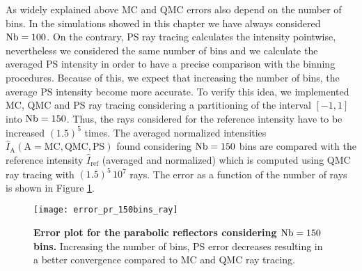 As widely explained above MC and QMC errors also depend on the number of bins. In the simulations showed in this chapter we have always considered $\textrm{Nb} = 100$. On the contrary, PS ray tracing calculates the intensity pointwise, nevertheless we considered the same number of bins and we calculate the averaged PS intensity in order to have a precise comparison with the binning procedures. Because of this, we expect that increasing the number of bins, the average PS intensity become more accurate. To verify this idea, we implemented MC, QMC and PS ray tracing considering a partitioning of the interval $[-1,1]$ into $\textrm{Nb} = 150$. Thus, the rays considered for the reference intensity have to be increased $(1.5)^5$ times. The averaged normalized intensities $\hat{I}_{\textrm{A}} (\textrm{A}=\textrm{MC}, \textrm{QMC}, \textrm{PS})$ found considering $\textrm{Nb}=150$ bins are compared with the reference intensity $\hat{I}_{\textrm{ref}}$ (averaged and normalized) which is computed using QMC ray tracing with $(1.5)^5\, 10^7$ rays. The error as a function of the number of rays is shown in Figure \ref{fig:error_pr_150_bin}. 
\begin{figure}[h]
  \center
  \texttt{[image: error\_pr\_150bins\_ray]}
  \caption{\textbf{Error plot for the parabolic reflectors considering $\textrm{Nb}=150$ bins.} Increasing the number of bins, PS error decreases resulting in a better convergence compared to MC and QMC ray tracing.}
  \label{fig:error_pr_150_bin}
\end{figure}
